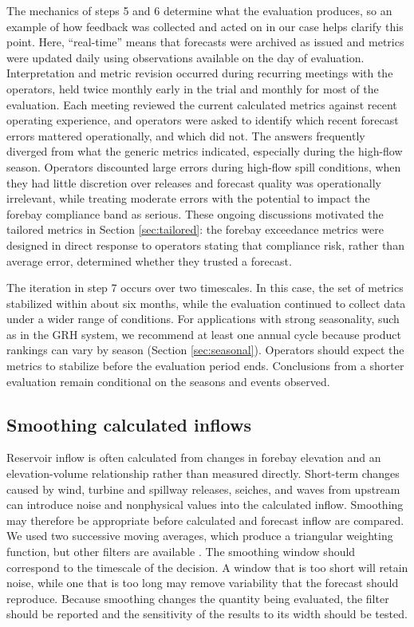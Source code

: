 \documentclass[MLA]{USG} %
\begin{document}
The mechanics of steps 5 and 6 determine what the evaluation produces, so an example of how feedback was collected and acted on in our case helps clarify this point. Here, ``real-time'' means that forecasts were archived as issued and metrics were updated daily using observations available on the day of evaluation. Interpretation and metric revision occurred during recurring meetings with the operators, held twice monthly early in the trial and monthly for most of the evaluation. Each meeting reviewed the current calculated metrics against recent operating experience, and operators were asked to identify which recent forecast errors mattered operationally, and which did not. The answers frequently diverged from what the generic metrics indicated, especially during the high-flow season. Operators discounted large errors during high-flow spill conditions, when they had little discretion over releases and forecast quality was operationally irrelevant, while treating moderate errors with the potential to impact the forebay compliance band as serious. These ongoing discussions motivated the tailored metrics in Section \ref{sec:tailored}: the forebay exceedance metrics were designed in direct response to operators stating that compliance risk, rather than average error, determined whether they trusted a forecast.

The iteration in step 7 occurs over two timescales. In this case, the set of metrics stabilized within about six months, while the evaluation continued to collect data under a wider range of conditions. For applications with strong seasonality, such as in the GRH system, we recommend at least one annual cycle because product rankings can vary by season (Section \ref{sec:seasonal}). Operators should expect the metrics to stabilize before the evaluation period ends. Conclusions from a shorter evaluation remain conditional on the seasons and events observed.


\subsection{Smoothing calculated inflows}
Reservoir inflow is often calculated from changes in forebay elevation and an elevation-volume relationship rather than measured directly. Short-term changes caused by wind, turbine and spillway releases, seiches, and waves from upstream can introduce noise and nonphysical values into the calculated inflow. Smoothing may therefore be appropriate before calculated and forecast inflow are compared. We used two successive moving averages, which produce a triangular weighting function, but other filters are available \citep{elshorbagyNoiseReductionChaotic2002}. The smoothing window should correspond to the timescale of the decision. A window that is too short will retain noise, while one that is too long may remove variability that the forecast should reproduce. Because smoothing changes the quantity being evaluated, the filter should be reported and the sensitivity of the results to its width should be tested.
\end{document}

